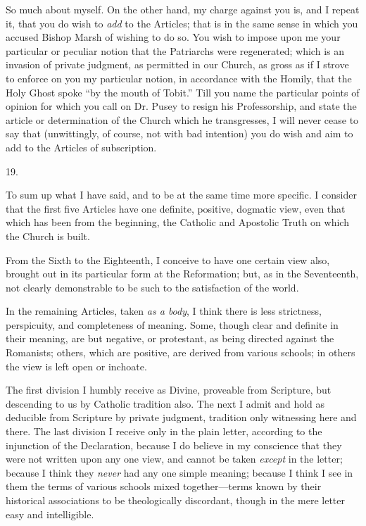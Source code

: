 So much about myself. On the other hand, my
charge against you is, and I repeat it, that you do wish to \emph{add}
to the Articles; that is in the same sense in which you accused Bishop
Marsh of wishing to do so. You wish to impose upon me your particular
or peculiar notion that the Patriarchs were regenerated; which is an
invasion of private judgment, as permitted in our Church, as gross as
if I strove to enforce on you my particular notion, in accordance with
the Homily, that the Holy Ghost spoke ``by the mouth of Tobit.'' Till
you name the particular points of opinion for which you call on Dr.
Pusey to resign his Professorship, and state the article or
determination of the Church which he transgresses, I will never cease
to say that (unwittingly, of course, not with bad intention) you do
wish and aim to add to the Articles of subscription.

19.

To sum up what I have said, and to be at the same
time more specific. I consider that the first five Articles have one
definite, positive, dogmatic view, even that which has been from the
beginning, the Catholic and Apostolic Truth on which the Church is
built.

From the Sixth to the Eighteenth, I conceive to
have one certain view also, brought out in its particular form at the
Reformation; but, as in the Seventeenth, not clearly demonstrable to
be such to the satisfaction of the world.

In the remaining Articles, taken \emph{as a body},
I think there is less strictness, perspicuity, and completeness of
meaning. Some, though clear and definite in their meaning, are but
negative, or protestant, as being directed against the
Romanists; others, which are positive, are derived from various
schools; in others the view is left open or inchoate.

The first division I humbly receive as Divine,
proveable from Scripture, but descending to us by Catholic tradition
also. The next I admit and hold as deducible from Scripture by private
judgment, tradition only witnessing here and there. The last division
I receive only in the plain letter, according to the injunction of the
Declaration, because I do believe in my conscience that they were not
written upon any one view, and cannot be taken \emph{except} in the letter;
because I think they \emph{never} had any one simple meaning; because I think
I see in them the terms of various schools mixed together—terms
known by their historical associations to be theologically discordant,
though in the mere letter easy and intelligible.

